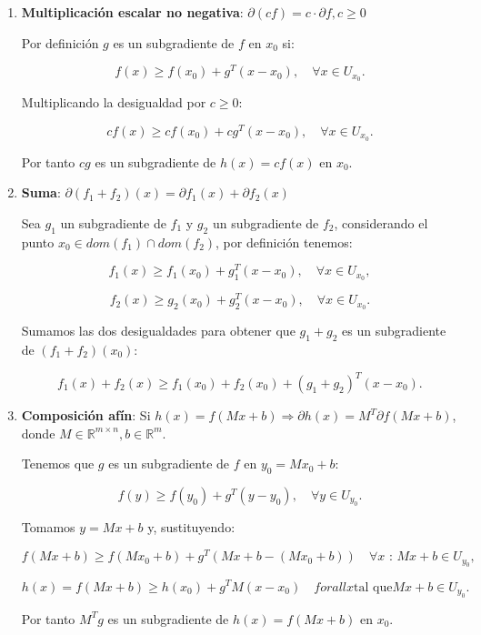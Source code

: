 \begin{enumerate}

	\item{\textbf{Multiplicación escalar no negativa}: $\partial (cf) = c \cdot \partial f , c\geq0$
	
	Por definición $g$ es un subgradiente de $f$ en $x_0$ si:
	
	$$f(x) \geq f(x_0) + g^T(x-x_0), \quad  \forall x \in U_{x_0}.$$

	Multiplicando la desigualdad por $c \geq 0$:

	$$cf(x) \geq cf(x_0) + cg^T(x-x_0), \quad  \forall x \in U_{x_0}.$$

	Por tanto $cg$ es un subgradiente de $h(x)=cf(x)$ en $x_0$.

	}
	
	\item{ \textbf{Suma}: $\partial (f_1+f_2)(x) = \partial f_1(x) + \partial f_2(x)$

	Sea $g_1$ un subgradiente de $f_1$ y $g_2$ un subgradiente de $f_2$, considerando el punto $x_0 \in dom(f_1) \cap dom(f_2)$, por definición tenemos:

	$$f_1(x) \geq f_1(x_0) + g_1^T(x-x_0), \quad \forall x \in U_{x_0},$$

	$$f_2(x) \geq g_2(x_0) + g_2^T(x-x_0), \quad \forall x \in U_{x_0}.$$

	Sumamos las dos desigualdades para obtener que $g_1 + g_2$ es un subgradiente de $(f_1 + f_2)(x_0)$:

	$$f_1(x) + f_2(x) \geq f_1(x_0) + f_2(x_0) + \left ( g_1 + g_2 \right ) ^T \left ( x - x_0 \right ).$$


	}
	
	\item{ \textbf{Composición afín}: Si $h(x)=f(Mx + b) \Rightarrow \partial h(x)= M^T \partial f(Mx+b)$, donde $M \in \mathbb{R}^{m \times n}, b \in \mathbb{R}^m$.
	
	Tenemos que $g$ es un subgradiente de $f$ en $y_0=Mx_0 + b$:
	
	$$f(y) \geq f(y_0) + g^T(y-y_0), \quad \forall y \in U_{y_0}.$$

	Tomamos $y=Mx + b$ y, sustituyendo:

	$$f(Mx + b) \geq f(Mx_0 + b) + g^T(Mx + b - (Mx_0 + b))  \quad \forall x \text{ : } Mx+b \in U_{y_0},$$

	$$h(x)=f(Mx+b) \geq h(x_0) + g^TM(x-x_0) \quad forall x \text{tal que} Mx+b \in U_{y_0}.$$

	Por tanto $M^Tg$ es un subgradiente de $h(x)=f(Mx+b)$ en $x_0$.

	}
	
\end{enumerate}


